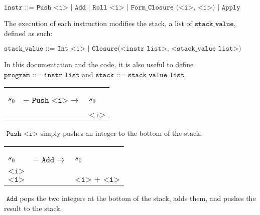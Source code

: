 \documentclass[11pt]{article}
\begin{document}
\medskip

$\texttt{instr ::= Push <i> | Add | Roll <i> | Form\_Closure (<i>, <i>) | Apply}$

\medskip

The execution of each instruction modifies the stack, a list of $\texttt{stack\_value}$, defined as such:

\medskip

$\texttt{stack\_value ::= Int <i> | Closure(<instr list>, <stack\_value list>)}$

\medskip

In this documentation and the code, it is also useful to define $\texttt{program ::= instr list}$ and $\texttt{stack ::= stack\_value list}$. 


\begin{center}
  \begin{tabular}{|P{2.5cm}|P{2.5cm}|P{2.5cm}|}
     
    &&\\ 
    &&\\
    &&\\
    $s_0$ & $- \texttt{  Push <i>} \rightarrow$ & $s_0$ \\
    &&\\
    &&\\ 
    && $\texttt{<i>}$ \\
     
  \end{tabular}
\end{center}

$\texttt{  Push <i>}$ simply pushes an integer to the bottom of the stack.

\begin{center}
  \begin{tabular}{|P{2.5cm}|P{2.5cm}|P{2.5cm}|}
     
    &&\\ 
    &&\\
    &&\\
    $s_0$ & $- \texttt{  Add} \rightarrow$ & $s_0$ \\
    &&\\ 
     $\texttt{<i>}$&&\\ 
     $\texttt{<i>}$&& $\texttt{<i> + <i>}$ \\
     
  \end{tabular}
\end{center}

$\texttt{  Add}$ pops the two integers at the bottom of the stack, adds them, and pushes the result to the stack.
\end{document}
